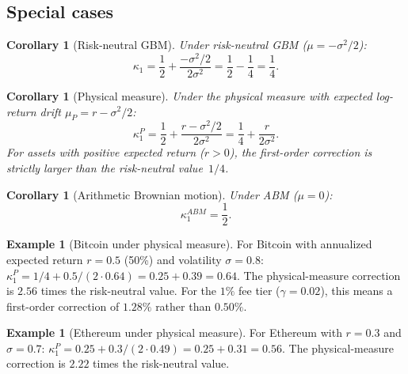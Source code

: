 \documentclass[11pt]{article}
\newtheorem{corollary}[theorem]{Corollary}
\theoremstyle{definition}
\newtheorem{example}[theorem]{Example}
\theoremstyle{remark}
\begin{document}
\subsection{Special cases}

\begin{corollary}[Risk-neutral GBM]\label{cor:gbm}
Under risk-neutral GBM ($\mu = -\sigma^2/2$):
\begin{equation}\label{eq:kappa1_gbm}
\kappa_1 = \frac{1}{2} + \frac{-\sigma^2/2}{2\sigma^2}
= \frac{1}{2} - \frac{1}{4} = \frac{1}{4}.
\end{equation}
\end{corollary}

\begin{corollary}[Physical measure]\label{cor:physical}
Under the physical measure with expected log-return drift
$\mu_P = r - \sigma^2/2$:
\begin{equation}\label{eq:kappa1_physical}
\kappa_1^P = \frac{1}{2} + \frac{r - \sigma^2/2}{2\sigma^2}
= \frac{1}{4} + \frac{r}{2\sigma^2}.
\end{equation}
For assets with positive expected return ($r > 0$), the first-order
correction is strictly larger than the risk-neutral value~$1/4$.
\end{corollary}

\begin{corollary}[Arithmetic Brownian motion]\label{cor:abm}
Under ABM ($\mu = 0$):
\begin{equation}\label{eq:kappa1_abm}
\kappa_1^{ABM} = \frac{1}{2}.
\end{equation}
\end{corollary}

\begin{example}[Bitcoin under physical measure]\label{ex:btc}
For Bitcoin with annualized expected return $r = 0.5$ (50\%) and
volatility $\sigma = 0.8$: $\kappa_1^P = 1/4 + 0.5/(2 \cdot 0.64)
= 0.25 + 0.39 = 0.64$. The physical-measure correction is $2.56$
times the risk-neutral value. For the $1\%$ fee tier
($\gamma = 0.02$), this means a first-order correction of $1.28\%$
rather than $0.50\%$.
\end{example}

\begin{example}[Ethereum under physical measure]\label{ex:eth}
For Ethereum with $r = 0.3$ and $\sigma = 0.7$:
$\kappa_1^P = 0.25 + 0.3/(2 \cdot 0.49) = 0.25 + 0.31 = 0.56$.
The physical-measure correction is $2.22$ times the risk-neutral
value.
\end{example}
\end{document}
